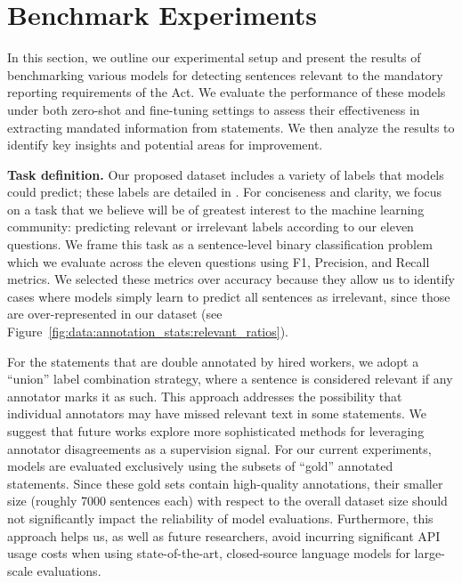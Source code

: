 \section{Benchmark Experiments}
\label{sec:experiments}

In this section, we outline our experimental setup and present the results of benchmarking various models for detecting sentences relevant to the mandatory reporting requirements of the Act. We evaluate the performance of these models under both zero-shot and fine-tuning settings to assess their effectiveness in extracting mandated information from statements. We then analyze the results to identify key insights and potential areas for improvement.  %

\textbf{Task definition.} Our proposed dataset includes a variety of labels that models could predict; these labels are detailed in \appendixDatasetLabels{}. For conciseness and clarity, we focus on a task that we believe will be of greatest interest to the machine learning community: predicting relevant or irrelevant labels according to our eleven questions. We frame this task as a sentence-level binary classification problem which we evaluate across the eleven questions using F1, Precision, and Recall metrics. We selected these metrics over accuracy because they allow us to identify cases where models simply learn to predict all sentences as irrelevant, since those are over-represented in our dataset (see Figure~\ref{fig:data:annotation_stats:relevant_ratios}). %

For the statements that are double annotated by hired workers, we adopt a ``union'' label combination strategy, where a sentence is considered relevant if any annotator marks it as such. This approach addresses the possibility that individual annotators may have missed relevant text in some statements. We suggest that future works explore more sophisticated methods for leveraging annotator disagreements as a supervision signal. For our current experiments, models are evaluated exclusively using the subsets of ``gold'' annotated statements. Since these gold sets contain high-quality annotations, their smaller size (roughly 7000 sentences each) with respect to the overall dataset size should not significantly impact the reliability of model evaluations. Furthermore, this approach helps us, as well as future researchers, avoid incurring significant API usage costs when using state-of-the-art, closed-source language models for large-scale evaluations. %

